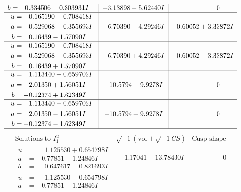 \documentclass[1p]{elsarticle_modified}
\theoremstyle{definition}
\newcommand{\I}{\sqrt{-1}}
\begin{document}
$$\begin{array}{c|c|c}
\begin{aligned}
b &= \phantom{-}0.334506 - 0.803931 I\end{aligned}
 & -3.13898 - 5.62440 I & \phantom{-0.000000 } 0 \\ \hline\begin{aligned}
u &= -0.165190 + 0.708418 I \\
a &= -0.529068 - 0.355693 I \\
b &= \phantom{-}0.16439 - 1.57090 I\end{aligned}
 & -6.70390 - 4.29246 I & -0.60052 + 3.33872 I \\ \hline\begin{aligned}
u &= -0.165190 - 0.708418 I \\
a &= -0.529068 + 0.355693 I \\
b &= \phantom{-}0.16439 + 1.57090 I\end{aligned}
 & -6.70390 + 4.29246 I & -0.60052 - 3.33872 I \\ \hline\begin{aligned}
u &= \phantom{-}1.113440 + 0.659702 I \\
a &= \phantom{-}2.01350 + 1.56051 I \\
b &= -0.12374 + 1.62349 I\end{aligned}
 & -10.5794 - 9.9278 I & \phantom{-0.000000 } 0 \\ \hline\begin{aligned}
u &= \phantom{-}1.113440 - 0.659702 I \\
a &= \phantom{-}2.01350 - 1.56051 I \\
b &= -0.12374 - 1.62349 I\end{aligned}
 & -10.5794 + 9.9278 I & \phantom{-0.000000 } 0\\
 \hline 
 \end{array}$$\newpage$$\begin{array}{c|c|c}  
\text{Solutions to }I^u_{1}& \I (\text{vol} + \sqrt{-1}CS) & \text{Cusp shape}\\
 \hline 
\begin{aligned}
u &= \phantom{-}1.125530 + 0.654798 I \\
a &= -0.77851 - 1.24846 I \\
b &= \phantom{-}0.647617 - 0.821693 I\end{aligned}
 & \phantom{-}1.17041 - 13.78430 I & \phantom{-0.000000 } 0 \\ \hline\begin{aligned}
u &= \phantom{-}1.125530 - 0.654798 I \\
a &= -0.77851 + 1.24846 I \\

\end{aligned}
\end{array}$$
\end{document}
